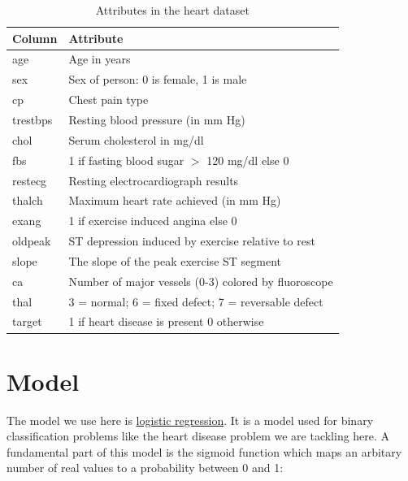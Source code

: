 \documentclass[12pt, a4]{article}
\begin{document}
\begin{table}[h]
\centering
\begin{tabular}{| l | l |}
  \hline
  Column   & Attribute                                            \\
  \hline
  age      & Age in years                                         \\
  sex      & Sex of person: 0 is female, 1 is male                \\
  cp       & Chest pain type                                      \\
  trestbps & Resting blood pressure (in mm Hg)                    \\
  chol     & Serum cholesterol in mg/dl                           \\
  fbs      & 1 if fasting blood sugar $>$ 120 mg/dl else 0        \\
  restecg  & Resting electrocardiograph results                   \\
  thalch   & Maximum heart rate achieved (in mm Hg)               \\
  exang    & 1 if exercise induced angina else 0                  \\
  oldpeak  & ST depression induced by exercise relative to rest   \\
  slope    & The slope of the peak exercise ST segment            \\
  ca       & Number of major vessels (0-3) colored by fluoroscope \\
  thal     & 3 = normal; 6 = fixed defect; 7 = reversable defect  \\
  target   & 1 if heart disease is present 0 otherwise            \\
  \hline
\end{tabular}
\caption{Attributes in the heart dataset}
\label{table:attributes}
\end{table}

\section{Model}

The model we use here is
\href{https://en.wikipedia.org/wiki/Logistic_regression}{logistic regression}.
It is a model used for binary classification problems like the heart disease
problem we are tackling here. A fundamental part of this model is the sigmoid function which maps an arbitary number of real values to a probability between 0 and 1:
\end{document}
